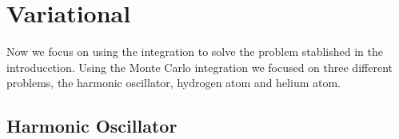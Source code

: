 \section{Variational}
 Now we focus on using the integration to solve the problem stablished in the introducction.
 Using the Monte Carlo integration we focused on three different problems, the harmonic oscillator,
 hydrogen atom and helium atom.

\subsection{Harmonic Oscillator}
  
